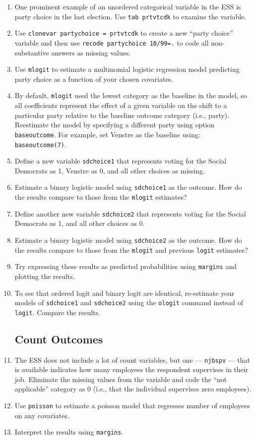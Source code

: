 \documentclass[a4paper,12pt]{article}
\begin{document}
\begin{enumerate}
\item One prominent example of an unordered categorical variable in the ESS is party choice in the last election. Use \texttt{tab prtvtcdk} to examine the variable.
\item Use \texttt{clonevar partychoice = prtvtcdk} to create a new ``party choice'' variable and then use \texttt{recode partychoice 10/99=.} to code all non-substantive answers as missing values.
\item Use \texttt{mlogit} to estimate a multinomial logistic regression model predicting party choice as a function of your chosen covariates.
\item By default, \texttt{mlogit} used the lowest category as the baseline in the model, so all coefficients represent the effect of a given variable on the shift to a particular party relative to the baseline outcome category (i.e., party). Reestimate the model by specifying a different party using option \texttt{baseoutcome}. For example, set Venstre as the baseline using: \texttt{baseoutcome(7)}.
\item Define a new variable \texttt{sdchoice1} that represents voting for the Social Democrats as 1, Venstre as 0, and all other choices as missing.
\item Estimate a binary logistic model using \texttt{sdchoice1} as the outcome. How do the results compare to those from the \texttt{mlogit} estimates?
\item Define another new variable \texttt{sdchoice2} that represents voting for the Social Democrats as 1, and all other choices as 0.
\item Estimate a binary logistic model using \texttt{sdchoice2} as the outcome. How do the results compare to those from the \texttt{mlogit} and previous \texttt{logit} estimates?
\item Try expressing these results as predicted probabilities using \texttt{margins} and plotting the results.
\item To see that ordered logit and binary logit are identical, re-estimate your models of \texttt{sdchoice1} and \texttt{sdchoice2} using the \texttt{ologit} command instead of \texttt{logit}. Compare the results.

\subsection*{Count Outcomes}

\item The ESS does not include a lot of count variables, but one --- \texttt{njbspv} --- that is available indicates how many employees the respondent supervises in their job. Eliminate the missing values from the variable and code the ``not applicable'' category as 0 (i.e., that the individual supervises zero employees).
\item Use \texttt{poisson} to estimate a poisson model that regresses number of employees on any covariates.
\item Interpret the results using \texttt{margins}.

\end{enumerate}
\end{document}
